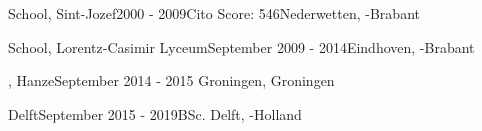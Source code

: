 \begin{rSection}{}
    {%
        \begin{experienceItem}
            { School, Sint-Jozef}{2000 - 2009}{Cito Score: 546}{Nederwetten, -Brabant}
        \end{experienceItem}

        \begin{experienceItem}
            { School, Lorentz-Casimir Lyceum}{September 2009 -  2014}{}{Eindhoven, -Brabant}
        \end{experienceItem}

        \begin{experienceItem}
            {, Hanze}{September 2014 -  2015} { }{Groningen, Groningen}
    \end{experienceItem}}{}

    \begin{experienceItem}
        { Delft}{September 2015 -  2019}{BSc. }{Delft, -Holland}
    \end{experienceItem}



\end{rSection}
